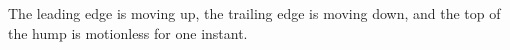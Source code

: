 The leading edge is moving up, the trailing edge is moving down, and the top of the
hump is motionless for one instant.



